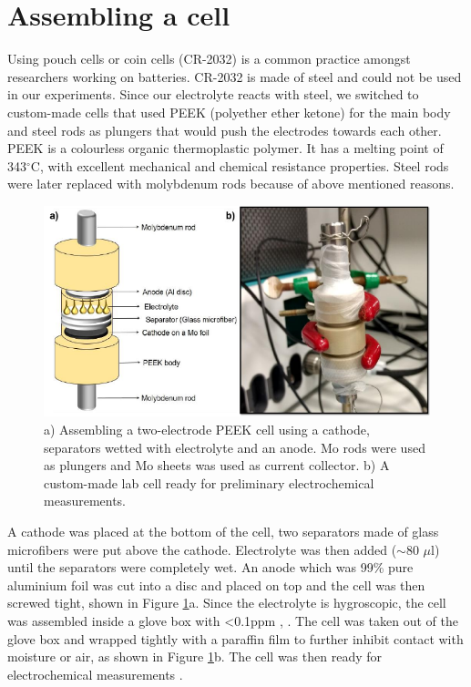 \section{Assembling a cell}
Using pouch cells or coin cells (CR-2032\textregistered) is a common practice amongst researchers working on batteries. CR-2032 is made of steel and could not be used in our experiments. Since our electrolyte reacts with steel, we switched to custom-made cells that used PEEK (polyether ether ketone) for the main body and steel rods as plungers that would push the electrodes towards each other. PEEK  is a colourless organic thermoplastic polymer. It has a melting point of 343$^{\circ}$C, with excellent mechanical and chemical resistance properties. Steel rods were later replaced with molybdenum rods because of above mentioned reasons. 

\begin{figure}[tbh!]
\centering
\includegraphics[width=\textwidth]{Figures/chap3fig/swagelok}
\caption{a) Assembling a two-electrode PEEK cell using a cathode, separators wetted with electrolyte and an anode. Mo rods were used as plungers and Mo sheets was used as current collector. b) A custom-made lab cell ready for preliminary electrochemical measurements.}
\label{Figures/chap3fig:swagelok}
\end{figure}

A cathode was placed at the bottom of the cell, two separators made of glass microfibers were put above the cathode. Electrolyte was then added ($\sim$80 $\mu$l) until the separators were completely wet. An anode which was 99\% pure aluminium foil was cut into a disc and placed on top and the cell was then screwed tight, shown in Figure \ref{Figures/chap3fig:swagelok}a. Since the electrolyte is hygroscopic, the cell was assembled inside a glove box with <0.1ppm , . The cell was taken out of the glove box and wrapped tightly with a paraffin film to further inhibit contact with moisture or air, as shown in Figure \ref{Figures/chap3fig:swagelok}b. The cell was then ready for electrochemical measurements . 





















